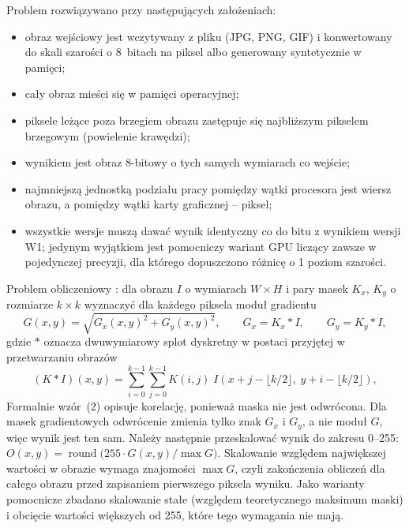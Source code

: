 \documentclass[12pt,a4paper]{article}
\begin{document}
Problem rozwiązywano przy następujących założeniach:
\begin{itemize}
	\item obraz wejściowy jest wczytywany z pliku (JPG, PNG, GIF) i konwertowany do skali szarości o 8~bitach na piksel albo generowany syntetycznie w pamięci;
	\item cały obraz mieści się w pamięci operacyjnej;
	\item piksele leżące poza brzegiem obrazu zastępuje się najbliższym pikselem brzegowym (powielenie krawędzi);
	\item wynikiem jest obraz 8-bitowy o tych samych wymiarach co wejście;
	\item najmniejszą jednostką podziału pracy pomiędzy wątki procesora jest wiersz obrazu, a pomiędzy wątki karty graficznej -- piksel;
	\item wszystkie wersje muszą dawać wynik identyczny co do bitu z wynikiem wersji W1; jedynym wyjątkiem jest pomocniczy wariant GPU liczący zawsze w pojedynczej precyzji, dla którego dopuszczono różnicę o 1 poziom szarości.
\end{itemize}

Problem obliczeniowy \cite{gonzalez,tadeusiewicz}: dla obrazu $I$ o wymiarach $W \times H$ i pary masek $K_x$, $K_y$ o rozmiarze $k \times k$ wyznaczyć dla każdego piksela moduł gradientu
\begin{equation}
	G(x, y) = \sqrt{G_x(x, y)^{2} + G_y(x, y)^{2}}, \qquad G_x = K_x * I, \qquad G_y = K_y * I,
	\label{eq:gradient}
\end{equation}
gdzie $*$ oznacza dwuwymiarowy splot dyskretny w postaci przyjętej w przetwarzaniu obrazów \cite{gonzalez}
\begin{equation}
	(K * I)(x, y) = \sum_{i=0}^{k-1} \sum_{j=0}^{k-1} K(i, j)\; I\!\left(x + j - \lfloor k/2 \rfloor,\; y + i - \lfloor k/2 \rfloor\right),
\end{equation}
Formalnie wzór~(2) opisuje korelację, ponieważ maska nie jest odwrócona. Dla masek gradientowych odwrócenie zmienia tylko znak $G_x$ i $G_y$, a nie moduł $G$, więc wynik jest ten sam. Należy następnie przeskalować wynik do zakresu 0--255: $O(x, y) = \operatorname{round}\big(255 \cdot G(x, y) / \max G\big)$. Skalowanie względem największej wartości w obrazie wymaga znajomości $\max G$, czyli zakończenia obliczeń dla całego obrazu przed zapisaniem pierwszego piksela wyniku. Jako warianty pomocnicze zbadano skalowanie stałe (względem teoretycznego maksimum maski) i obcięcie wartości większych od 255, które tego wymagania nie mają.
\end{document}

